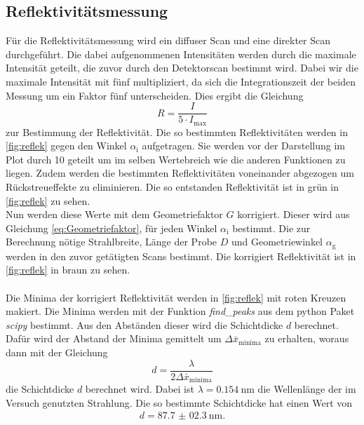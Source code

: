 \subsection{Reflektivitätsmessung}
Für die Reflektivitätsmessung wird ein diffuser Scan und eine direkter Scan durchgeführt.
Die dabei aufgenommenen Intensitäten werden durch die maximale Intensität geteilt, die zuvor durch den Detektorscan bestimmt wird.
Dabei wir die maximale Intensität mit fünf multipliziert, da sich die Integrationszeit der beiden Messung um ein Faktor fünf unterscheiden.
Dies ergibt die Gleichung 
\begin{equation*}
    R = \frac{I}{5\cdot I_\text{max}}
\end{equation*} 
zur Bestimmung der Reflektivität.
Die so bestimmten Reflektivitäten werden in \autoref{fig:reflek} gegen den Winkel $\alpha_\text{i}$ aufgetragen.
Sie werden vor der Darstellung im Plot durch 10 geteilt um im selben Wertebreich wie die anderen Funktionen zu liegen.
Zudem werden die bestimmten Reflektivitäten voneinander abgezogen um Rückstreueffekte zu eliminieren.
Die so entstanden Reflektivität ist in grün in \autoref{fig:reflek} zu sehen.
\\
Nun werden diese Werte mit dem Geometriefaktor $G$ korrigiert.
Dieser wird aus Gleichung \eqref{eq:Geometriefaktor}, für jeden Winkel $\alpha_\text{i}$ bestimmt.
Die zur Berechnung nötige Strahlbreite, Länge der Probe $D$ und Geometriewinkel $\alpha_\text{g}$ werden in den zuvor getätigten Scans bestimmt.
Die korrigiert Reflektivität ist in \autoref{fig:reflek} in braun zu sehen.
\\\\
Die Minima der korrigiert Reflektivität werden in \autoref{fig:reflek} mit roten Kreuzen makiert.
Die Minima werden mit der Funktion \textit{find\_peaks} aus dem python Paket \textit{scipy} \cite{scipy} bestimmt.
Aus den Abständen dieser wird die Schichtdicke $d$ berechnet.
Dafür wird der Abstand der Minima gemittelt um $\Delta \bar{x} _\text{minima}$ zu erhalten, woraus dann mit der Gleichung
\begin{equation*}
    d = \frac{\lambda}{2\Delta \bar{x} _\text{minima}}
\end{equation*}
die Schichtdicke $d$ berechnet wird.
Dabei ist $\lambda = \SI{0.154}{\nano\meter}$ die Wellenlänge der im Versuch genutzten Strahlung.
Die so bestimmte Schichtdicke hat einen Wert von
\begin{align*}
    d = \SI{87.7(023)}{\nano\meter}.
\end{align*}

